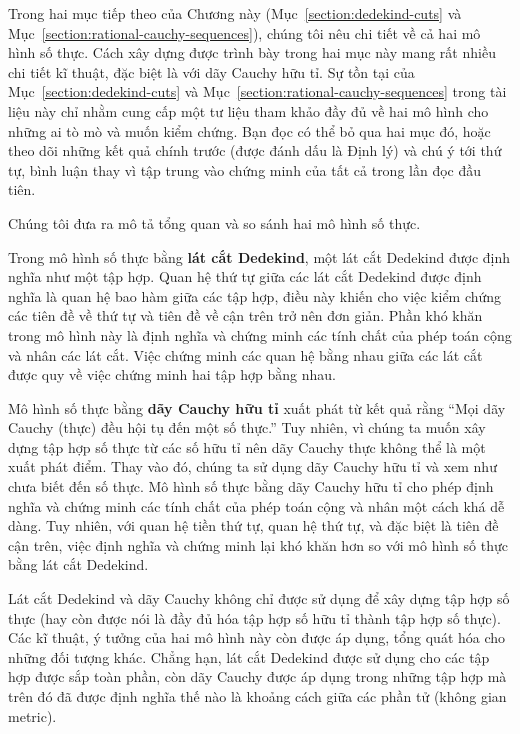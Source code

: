 Trong hai mục tiếp theo của Chương này (Mục~\ref{section:dedekind-cuts} và Mục~\ref{section:rational-cauchy-sequences}), chúng tôi nêu chi tiết về cả hai mô hình số thực. Cách xây dựng được trình bày trong hai mục này mang rất nhiều chi tiết kĩ thuật, đặc biệt là với dãy Cauchy hữu tỉ. Sự tồn tại của Mục~\ref{section:dedekind-cuts} và Mục~\ref{section:rational-cauchy-sequences} trong tài liệu này chỉ nhằm cung cấp một tư liệu tham khảo đầy đủ về hai mô hình cho những ai tò mò và muốn kiểm chứng. Bạn đọc có thể bỏ qua hai mục đó, hoặc theo dõi những kết quả chính trước (được đánh dấu là Định lý) và chú ý tới thứ tự, bình luận thay vì tập trung vào chứng minh của tất cả trong lần đọc đầu tiên.

Chúng tôi đưa ra mô tả tổng quan và so sánh hai mô hình số thực.

Trong mô hình số thực bằng \textbf{lát cắt Dedekind}, một lát cắt Dedekind được định nghĩa như một tập hợp. Quan hệ thứ tự giữa các lát cắt Dedekind được định nghĩa là quan hệ bao hàm giữa các tập hợp, điều này khiến cho việc kiểm chứng các tiên đề về thứ tự và tiên đề về cận trên trở nên đơn giản. Phần khó khăn trong mô hình này là định nghĩa và chứng minh các tính chất của phép toán cộng và nhân các lát cắt. Việc chứng minh các quan hệ bằng nhau giữa các lát cắt được quy về việc chứng minh hai tập hợp bằng nhau.

Mô hình số thực bằng \textbf{dãy Cauchy hữu tỉ} xuất phát từ kết quả rằng ``Mọi dãy Cauchy (thực) đều hội tụ đến một số thực.\@'' Tuy nhiên, vì chúng ta muốn xây dựng tập hợp số thực từ các số hữu tỉ nên dãy Cauchy thực không thể là một xuất phát điểm. Thay vào đó, chúng ta sử dụng dãy Cauchy hữu tỉ và xem như chưa biết đến số thực. Mô hình số thực bằng dãy Cauchy hữu tỉ cho phép định nghĩa và chứng minh các tính chất của phép toán cộng và nhân một cách khá dễ dàng. Tuy nhiên, với quan hệ tiền thứ tự, quan hệ thứ tự, và đặc biệt là tiên đề cận trên, việc định nghĩa và chứng minh lại khó khăn hơn so với mô hình số thực bằng lát cắt Dedekind.

Lát cắt Dedekind và dãy Cauchy không chỉ được sử dụng để xây dựng tập hợp số thực (hay còn được nói là đầy đủ hóa tập hợp số hữu tỉ thành tập hợp số thực). Các kĩ thuật, ý tưởng của hai mô hình này còn được áp dụng, tổng quát hóa cho những đối tượng khác. Chẳng hạn, lát cắt Dedekind được sử dụng cho các tập hợp được sắp toàn phần, còn dãy Cauchy được áp dụng trong những tập hợp mà trên đó đã được định nghĩa thế nào là khoảng cách giữa các phần tử (không gian metric).

